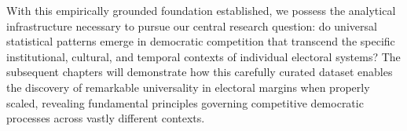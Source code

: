 With this empirically grounded foundation established, we possess the analytical infrastructure necessary to pursue our central research question: do universal statistical patterns emerge in democratic competition that transcend the specific institutional, cultural, and temporal contexts of individual electoral systems? The subsequent chapters will demonstrate how this carefully curated dataset enables the discovery of remarkable universality in electoral margins when properly scaled, revealing fundamental principles governing competitive democratic processes across vastly different contexts.
